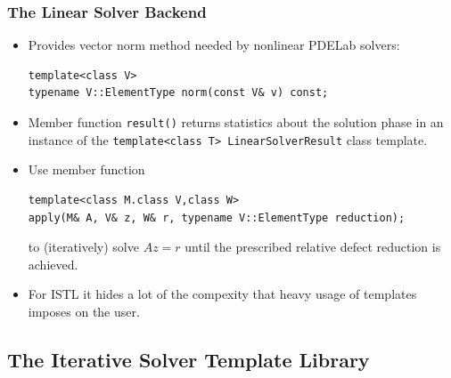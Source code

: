 {\begin{frame}[fragile]
  \frametitle<presentation>{The Linear Solver Backend}
  \begin{itemize}
  \item Provides vector norm method needed by nonlinear PDELab solvers:
      \begin{lstlisting}
template<class V>
typename V::ElementType norm(const V& v) const;
      \end{lstlisting}
    \item Member function \lstinline!result()! returns statistics
      about the solution phase in an instance of the
      \lstinline!template<class T> LinearSolverResult! class template.
\item Use member function 
  \begin{lstlisting}
template<class M.class V,class W>
apply(M& A, V& z, W& r, typename V::ElementType reduction);
  \end{lstlisting}
  to (iteratively) solve $Az=r$ until the prescribed relative defect
  reduction is achieved.
  \item For ISTL it hides a lot of the compexity that heavy usage of
    templates imposes on the user.
  \end{itemize}
\end{frame}

\subsection{The Iterative Solver Template Library}
\label{sec:iter-solv-templ}

}

